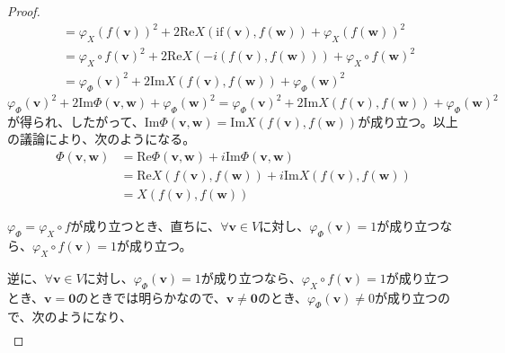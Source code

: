 \documentclass[dvipdfmx]{jsarticle}
\begin{document}
\begin{proof}
\begin{align*}
&= {\varphi_{X}\left( f\left( \mathbf{v} \right) \right)}^{2} + 2\mathrm{Re}{X\left( \mathrm{if}\left( \mathbf{v} \right),f\left( \mathbf{w} \right) \right)} + {\varphi_{X}\left( f\left( \mathbf{w} \right) \right)}^{2}\\
&= {\varphi_{X} \circ f\left( \mathbf{v} \right)}^{2} + 2\mathrm{Re}{X\left( - i\left( f\left( \mathbf{v} \right),f\left( \mathbf{w} \right) \right) \right)} + {\varphi_{X} \circ f\left( \mathbf{w} \right)}^{2}\\
&= {\varphi_{\varPhi }\left( \mathbf{v} \right)}^{2} + 2\mathrm{Im}{X\left( f\left( \mathbf{v} \right),f\left( \mathbf{w} \right) \right)} + {\varphi_{\varPhi }\left( \mathbf{w} \right)}^{2}
\end{align*}
${\varphi_{\varPhi }\left( \mathbf{v} \right)}^{2} + 2\mathrm{Im}{\varPhi \left( \mathbf{v},\mathbf{w} \right)} + {\varphi_{\varPhi }\left( \mathbf{w} \right)}^{2} = {\varphi_{\varPhi }\left( \mathbf{v} \right)}^{2} + 2\mathrm{Im}{X\left( f\left( \mathbf{v} \right),f\left( \mathbf{w} \right) \right)} + {\varphi_{\varPhi }\left( \mathbf{w} \right)}^{2}$が得られ、したがって、$\mathrm{Im}{\varPhi \left( \mathbf{v},\mathbf{w} \right)} = \mathrm{Im}{X\left( f\left( \mathbf{v} \right),f\left( \mathbf{w} \right) \right)}$が成り立つ。以上の議論により、次のようになる。
\begin{align*}
\varPhi \left( \mathbf{v},\mathbf{w} \right) &= \mathrm{Re}{\varPhi \left( \mathbf{v},\mathbf{w} \right)} + i\mathrm{Im}{\varPhi \left( \mathbf{v},\mathbf{w} \right)}\\
&= \mathrm{Re}{X\left( f\left( \mathbf{v} \right),f\left( \mathbf{w} \right) \right)} + i\mathrm{Im}{X\left( f\left( \mathbf{v} \right),f\left( \mathbf{w} \right) \right)}\\
&= X\left( f\left( \mathbf{v} \right),f\left( \mathbf{w} \right) \right)
\end{align*}\par
$\varphi_{\varPhi } = \varphi_{X} \circ f$が成り立つとき、直ちに、$\forall\mathbf{v} \in V$に対し、$\varphi_{\varPhi }\left( \mathbf{v} \right) = 1$が成り立つなら、$\varphi_{X} \circ f\left( \mathbf{v} \right) = 1$が成り立つ。\par
逆に、$\forall\mathbf{v} \in V$に対し、$\varphi_{\varPhi }\left( \mathbf{v} \right) = 1$が成り立つなら、$\varphi_{X} \circ f\left( \mathbf{v} \right) = 1$が成り立つとき、$\mathbf{v} = \mathbf{0}$のときでは明らかなので、$\mathbf{v} \neq \mathbf{0}$のとき、$\varphi_{\varPhi }\left( \mathbf{v} \right) \neq 0$が成り立つので、次のようになり、
\begin{align*}

\end{align*}
\end{proof}
\end{document}
